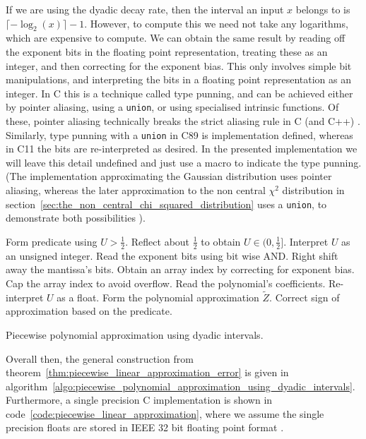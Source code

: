 \documentclass[9pt,a4paper,english]{extarticle}
\begin{document}
If we are using the dyadic decay rate, then the interval an input $ x $  belongs to is $ \lceil -{\log}_2(x) \rceil - 1 $. However, to compute this we need not take any logarithms, which are expensive to compute. We can obtain the same result by reading off the exponent bits in the floating point representation, treating these as an integer, and then correcting for the exponent bias.  This only involves simple bit manipulations, and interpreting the bits in a floating point representation as an integer. In C this is a technique called type punning, and can be achieved either by pointer aliasing, using a \texttt{union}, or using specialised intrinsic functions. Of these, pointer aliasing technically breaks the strict aliasing rule in C (and C++) \citep[6.5.2.3]{iso2012c11} \citep[pages~163--164]{stallman2020gcc}. Similarly, type punning with a \texttt{union} in C89 is implementation defined, whereas in C11 the bits are re-interpreted as desired. In the presented implementation we will leave this detail undefined and just use a macro to indicate the type punning. (The implementation approximating the Gaussian distribution uses pointer aliasing, whereas the later approximation to the non central $ \chi^2 $ distribution in section~\ref{sec:the_non_central_chi_squared_distribution} uses a \texttt{union}, to demonstrate both possibilities \citep{sheridan2020approximate_random}).

\begin{algorithm}[h!tb]
\DontPrintSemicolon
{}
Form predicate using $ U > \tfrac{1}{2} $.\;
Reflect about $ \tfrac{1}{2} $ to obtain $ U \in (0, \tfrac{1}{2}] $.\;
Interpret $ U $ as an unsigned integer.\;
Read the exponent bits using bit wise AND.\;
Right shift away the mantissa's bits.\;
Obtain an array index by correcting for exponent bias.\;
Cap the array index to avoid overflow.\;
Read the polynomial's coefficients.\;
Re-interpret $ U $ as a float.\;
Form the polynomial approximation $ \widetilde{Z} $.\;
Correct sign of approximation based on the predicate.\;
\caption{Piecewise polynomial approximation using dyadic intervals.}
\label{algo:piecewise_polynomial_approximation_using_dyadic_intervals}
\end{algorithm}

Overall then, the general construction from theorem~\ref{thm:piecewise_linear_approximation_error} is given in algorithm~\ref{algo:piecewise_polynomial_approximation_using_dyadic_intervals}. Furthermore, a single precision C implementation is shown in code~\ref{code:piecewise_linear_approximation}, where we assume the single precision floats are stored in IEEE 32 bit floating point format \citep{ieee2008ieee}. 
\end{document}
